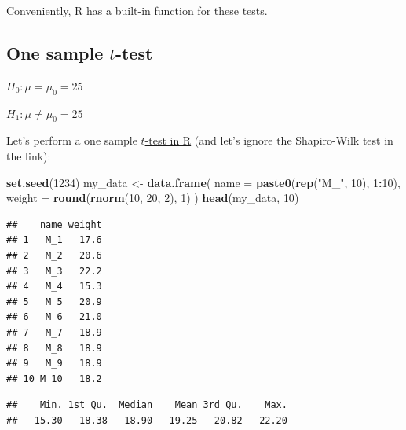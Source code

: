 \documentclass[
]{book}
\newenvironment{Shaded}{\begin{snugshade}}{\end{snugshade}}
\newcommand{\AttributeTok}[1]{\textcolor[rgb]{0.13,0.29,0.53}{#1}}
\newcommand{\DecValTok}[1]{\textcolor[rgb]{0.00,0.00,0.81}{#1}}
\newcommand{\FunctionTok}[1]{\textcolor[rgb]{0.13,0.29,0.53}{\textbf{#1}}}
\newcommand{\NormalTok}[1]{#1}
\newcommand{\OtherTok}[1]{\textcolor[rgb]{0.56,0.35,0.01}{#1}}
\newcommand{\SpecialCharTok}[1]{\textcolor[rgb]{0.81,0.36,0.00}{\textbf{#1}}}
\newcommand{\StringTok}[1]{\textcolor[rgb]{0.31,0.60,0.02}{#1}}
\begin{document}
Conveniently, R has a built-in function for these tests.

\subsection{\texorpdfstring{One sample \(t\)-test}{One sample t-test}}\label{one-sample-t-test}

\(H_0: \mu = \mu_0 = 25\)

\(H_1: \mu \ne \mu_0 = 25\)

Let's perform a one sample \href{https://www.sthda.com/english/wiki/one-sample-t-test-in-r}{\(t\)-test in R}
(and let's ignore the Shapiro-Wilk test in the link):

\begin{Shaded}
\begin{Highlighting}[]
\FunctionTok{set.seed}\NormalTok{(}\DecValTok{1234}\NormalTok{)}
\NormalTok{my\_data }\OtherTok{\textless{}{-}} \FunctionTok{data.frame}\NormalTok{(}
  \AttributeTok{name =} \FunctionTok{paste0}\NormalTok{(}\FunctionTok{rep}\NormalTok{(}\StringTok{"M\_"}\NormalTok{, }\DecValTok{10}\NormalTok{), }\DecValTok{1}\SpecialCharTok{:}\DecValTok{10}\NormalTok{),}
  \AttributeTok{weight =} \FunctionTok{round}\NormalTok{(}\FunctionTok{rnorm}\NormalTok{(}\DecValTok{10}\NormalTok{, }\DecValTok{20}\NormalTok{, }\DecValTok{2}\NormalTok{), }\DecValTok{1}\NormalTok{)}
\NormalTok{)}
\FunctionTok{head}\NormalTok{(my\_data, }\DecValTok{10}\NormalTok{)}
\end{Highlighting}
\end{Shaded}

\begin{verbatim}
##    name weight
## 1   M_1   17.6
## 2   M_2   20.6
## 3   M_3   22.2
## 4   M_4   15.3
## 5   M_5   20.9
## 6   M_6   21.0
## 7   M_7   18.9
## 8   M_8   18.9
## 9   M_9   18.9
## 10 M_10   18.2
\end{verbatim}

\begin{Shaded}
\end{Shaded}

\begin{verbatim}
##    Min. 1st Qu.  Median    Mean 3rd Qu.    Max. 
##   15.30   18.38   18.90   19.25   20.82   22.20
\end{verbatim}
\end{document}
